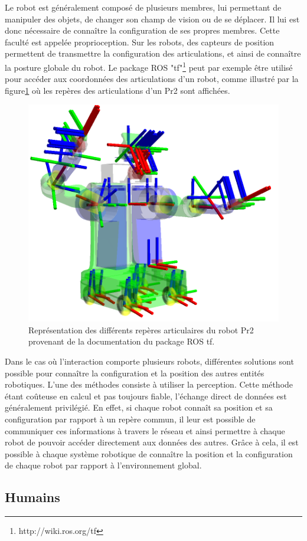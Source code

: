 \documentclass[a4paper,11pt,twoside]{StyleThese}
\begin{document}
Le robot est généralement composé de plusieurs membres, lui permettant de manipuler des objets, de changer son champ de vision ou de se déplacer. Il lui est donc nécessaire de connaître la configuration de ses propres membres. Cette faculté est appelée proprioception. Sur les robots, des capteurs de position permettent de transmettre la configuration des articulations, et ainsi de connaître la posture globale du robot. Le package ROS "tf"\footnote{http://wiki.ros.org/tf} peut par exemple être utilisé pour accéder aux coordonnées des articulations d'un robot, comme illustré par la figure\ref{fig:frames} où les repères des articulations d'un Pr2 sont affichées.

\begin{figure}[ht!]
 \centering
  \includegraphics[width=0.59\linewidth]{./img/frames2.png} 
  \caption {Représentation des différents repères articulaires du robot Pr2 provenant de la documentation du package ROS tf.}
  \label{fig:frames}
\end{figure}

Dans le cas où l'interaction comporte plusieurs robots, différentes solutions sont possible pour connaître la configuration et la position des autres entités robotiques.
L'une des méthodes consiste à utiliser la perception. Cette méthode étant coûteuse en calcul et pas toujours fiable, l'échange direct de données est généralement privilégié. En effet, si chaque robot connaît sa position et sa configuration par rapport à un repère commun, il leur est possible de communiquer ces informations à travers le réseau et ainsi permettre à chaque robot de pouvoir accéder directement aux données des autres. Grâce à cela, il est possible à chaque système robotique de connaître la position et la configuration de chaque robot par rapport à l'environnement global.


\subsection{Humains}
\end{document}
